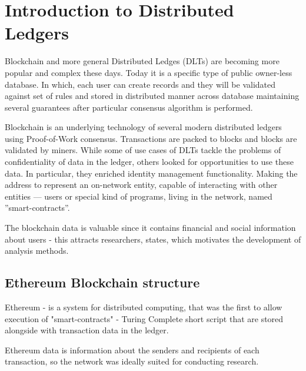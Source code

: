 \Introduction

\section{Introduction to Distributed Ledgers}
Blockchain and more general Distributed Ledges (DLTs) are becoming more popular and complex these days. Today it is a specific type of public owner-less database. In which, each user can create records and they will be validated against set of rules and stored in distributed manner across database maintaining several guarantees after particular consensus algorithm is performed.

Blockchain is an underlying technology of several modern distributed ledgers using Proof-of-Work consensus. Transactions are packed to blocks and blocks are validated by miners. While some of use cases of DLTs tackle the problems of confidentiality of data in the ledger, others looked for opportunities to use these data. In particular, they enriched identity management functionality. Making the address to represent an on-network entity, capable of interacting with other entities — users or special kind of programs, living in the network, named ”smart-contracts”.

The blockchain data is valuable since it contains financial and social information about users - this attracts researchers, states, which motivates the development of analysis methods.

\subsection{Ethereum Blockchain structure}
Ethereum - is a system for distributed computing, that was the first to allow execution of "smart-contracts" - Turing Complete short script that are stored alongside with transaction data in the ledger. 

Ethereum data is information about the senders and recipients of each transaction, so the network was ideally suited for conducting research.

